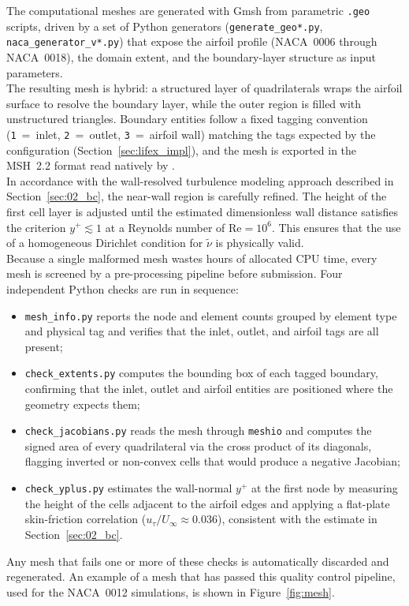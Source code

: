 The computational meshes are generated with Gmsh from parametric \texttt{.geo} scripts, driven by a set of Python generators (\texttt{generate\_geo*.py}, \texttt{naca\_generator\_v*.py}) that expose the airfoil profile (NACA~0006 through NACA~0018), the domain extent, and the boundary-layer structure as input parameters.\\

The resulting mesh is hybrid: a structured layer of quadrilaterals wraps the airfoil surface to resolve the boundary layer, while the outer region is filled with unstructured triangles. Boundary entities follow a fixed tagging convention (\texttt{1}~=~inlet, \texttt{2}~=~outlet, \texttt{3}~=~airfoil wall) matching the tags expected by the \textbf{\lifex} configuration (Section~\ref{sec:lifex_impl}), and the mesh is exported in the MSH~2.2 format read natively by \dealii.\\

In accordance with the wall-resolved turbulence modeling approach described in Section~\ref{sec:02_bc}, the near-wall region is carefully refined. The height of the first cell layer is adjusted until the estimated dimensionless wall distance satisfies the criterion $y^+ \lesssim 1$ at a Reynolds number of $\mathrm{Re}=10^6$. This ensures that the use of a homogeneous Dirichlet condition for $\tilde{\nu}$ is physically valid.\\

Because a single malformed mesh wastes hours of allocated CPU time, every mesh is screened by a pre-processing pipeline before submission. Four independent Python checks are run in sequence:
\begin{itemize}[itemsep=2ex, topsep=2ex]
  \item[-] \texttt{mesh\_info.py} reports the node and element counts grouped by element type and physical tag and verifies that the inlet, outlet, and airfoil tags are all present;
  \item[-] \texttt{check\_extents.py} computes the bounding box of each tagged boundary, confirming that the inlet, outlet and airfoil entities are positioned where the geometry expects them;
  \item[-] \texttt{check\_jacobians.py} reads the mesh through \texttt{meshio} and computes the signed area of every quadrilateral via the cross product of its diagonals, flagging inverted or non-convex cells that would produce a negative Jacobian;
  \item[-] \texttt{check\_yplus.py} estimates the wall-normal $y^+$ at the first node by measuring the height of the cells adjacent to the airfoil edges and applying a flat-plate skin-friction correlation ($u_\tau/U_\infty \approx 0.036$), consistent with the estimate in Section~\ref{sec:02_bc}.
\end{itemize}
Any mesh that fails one or more of these checks is automatically discarded and regenerated. An example of a mesh that has passed this quality control pipeline, used for the NACA~0012 simulations, is shown in Figure~\ref{fig:mesh}.

